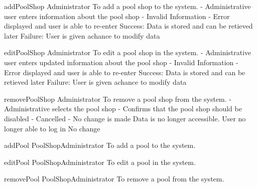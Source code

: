 \usecase
{addPoolShop}
{Administrator}
{To add a pool shop to the system.}
{}
{  - Administrative user enters information about the pool shop}
{  - Invalid Information
    - Error displayed and user is able to re-enter}
{Success: Data is stored and can be retieved later
Failure: User is given achance to modify data}

\usecase
{editPoolShop}
{Administrator}
{To edit a pool shop in the system.}
{}
{  - Administrative user enters updated information about the pool shop}
{  - Invalid Information
    - Error displayed and user is able to re-enter}
{Success: Data is stored and can be retieved later
Failure: User is given achance to modify data}

\usecase
{removePoolShop}
{Administrator}
{To remove a pool shop from the system.}
{}
{  - Administrative selects the pool shop
  - Confirms that the pool shop should be disabled}
{  - Cancelled
    - No change is made}
{Data is no longer accessible. User no longer able to log in}
{No change}

\usecase
{addPool}
{PoolShopAdministrator}
{To add a pool to the system.}
{}
{}
{}
{}

\usecase
{editPool}
{PoolShopAdministrator}
{To edit a pool in the system.}
{}
{}
{}
{}

\usecase
{removePool}
{PoolShopAdministrator}
{To remove a pool from the system.}
{}
{}
{}
{}




